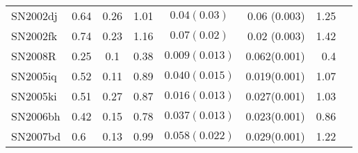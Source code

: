\begin{table*}
\begin{center}
\begin{tabular}{llcccrrr}
SN2002dj	&	0.64	&	0.26	&	1.01	&	$   0.04 (0.03)$ & 0.06 (0.003)		& 1.25		\\
SN2002fk	&	0.74	&	0.23	&	1.16	&	$0.07 (0.02)$   & 0.02 (0.003)		& 1.42 				\\
SN2008R		&	0.25	&	0.1	&	0.38	&  $0.009(0.013)$ & 0.062(0.001)          & 	0.4		\\
SN2005iq	&	0.52	&	0.11	&	0.89	& $0.040(0.015)$ & 0.019(0.001) & 1.07	\\	
SN2005ki	&	0.51	&	0.27	&	0.87	& $0.016(0.013)$ & 0.027(0.001) & 1.03	\\
SN2006bh	&	0.42	&	0.15	&	0.78	& $0.037(0.013)$ & 0.023(0.001) & 0.86	\\
SN2007bd	&	0.6	&	0.13	&	0.99	&  $0.058(0.022)$ & 0.029(0.001)        & 1.22	\\
\hline
\end{tabular}
\label{tab:mni}
\end{center}
\end{table*}
